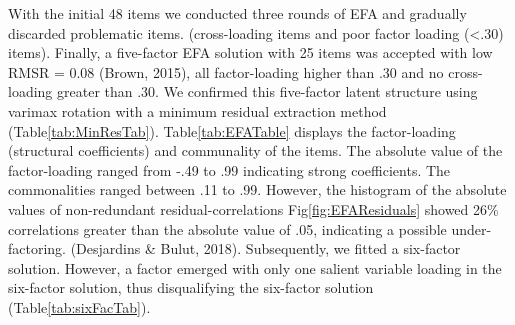 \documentclass[
  english,
  man]{apa6}
\begin{document}
With the initial 48 items we conducted three rounds of EFA and gradually discarded problematic items. (cross-loading items and poor factor loading (\textless.30) items). Finally, a five-factor EFA solution with 25 items was accepted with low RMSR = 0.08 (Brown, 2015), all factor-loading higher than .30 and no cross-loading greater than .30. We confirmed this five-factor latent structure using varimax rotation with a minimum residual extraction method (Table\ref{tab:MinResTab}). Table\ref{tab:EFATable} displays the factor-loading (structural coefficients) and communality of the items. The absolute value of the factor-loading ranged from -.49 to .99 indicating strong coefficients. The commonalities ranged between .11 to .99. However, the histogram of the absolute values of non-redundant residual-correlations Fig\ref{fig:EFAResiduals} showed 26\% correlations greater than the absolute value of .05, indicating a possible under-factoring. (Desjardins \& Bulut, 2018). Subsequently, we fitted a six-factor solution. However, a factor emerged with only one salient variable loading in the six-factor solution, thus disqualifying the six-factor solution (Table\ref{tab:sixFacTab}).
\end{document}

